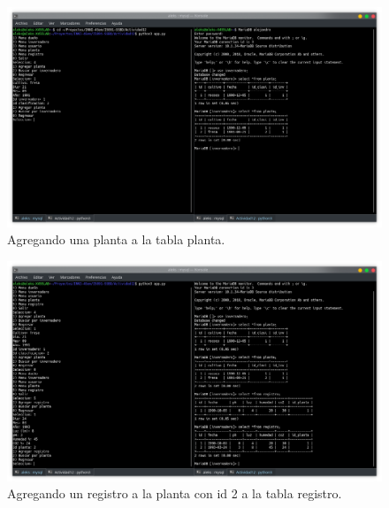 \documentclass[fleqn,10pt]{article}
\begin{document}
\begin{figure}[h]
  \begin{center}
    \includegraphics[scale=0.4]{./pics/01.png}
  \end{center}
  \vspace{-20pt}
  \caption{Agregando una planta a la tabla planta.}
  \vspace{-10pt}
\end{figure}

\begin{figure}[h]
  \begin{center}
    \includegraphics[scale=0.4]{./pics/02.png}
  \end{center}
  \vspace{-20pt}
  \caption{Agregando un registro a la planta con id 2 a la tabla registro.}
  \vspace{-10pt}
\end{figure}
\end{document}
